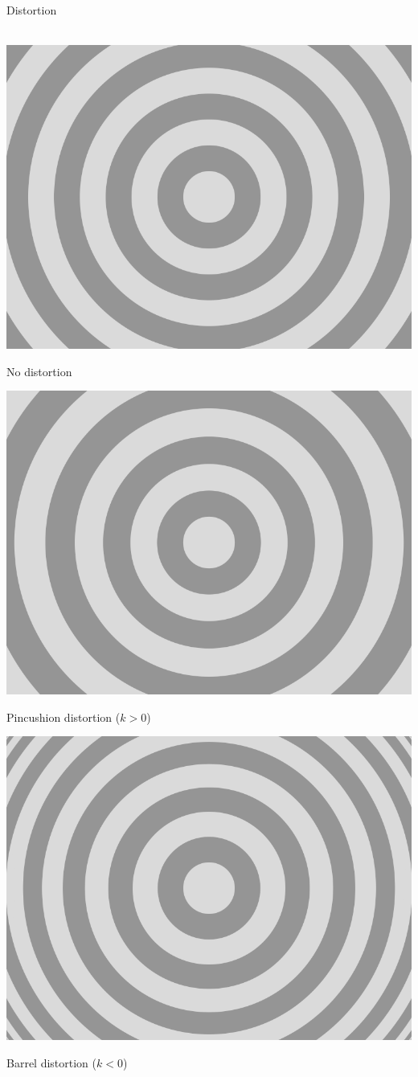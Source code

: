 \documentclass[utf8,stillsansserifmath,fleqn,t]{beamer}
\begin{document}
\begin{frame}
\frametitle{\insertsection}
Distortion\\~\\
\begin{minipage}{.49\textwidth}
\centerline{\includegraphics[width=.6\textwidth]{./fig/distortion-circle-none.png}}
\centerline{No distortion}
\vspace{1ex}
\centerline{\includegraphics[width=.6\textwidth]{./fig/distortion-circle-pincushion.png}}
\centerline{Pincushion distortion ($k>0$)}
\end{minipage}\hfill
\begin{minipage}{.49\textwidth}
\centerline{\includegraphics[width=.6\textwidth]{./fig/distortion-circle-barrel.png}}
\centerline{Barrel distortion ($k < 0$)}
\vspace{1ex}

\end{minipage}
\end{frame}
\end{document}
